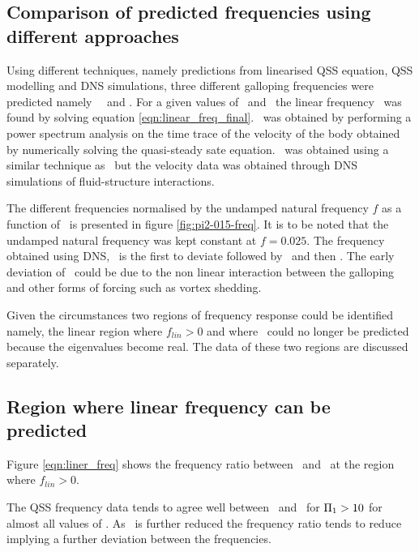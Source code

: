 \subsection{Comparison of predicted frequencies using different approaches}

Using different techniques, namely predictions from linearised QSS equation, QSS modelling and DNS simulations, three different galloping frequencies were predicted namely \freqlin\ \freqqss\ and \freqdns. For a given values of \massstiff\ and \massdamp\, the linear frequency \freqlin\ was found by solving equation \ref{eqn:linear_freq_final}. \freqqss\ was obtained by performing a power spectrum analysis on the time trace of the velocity of the body  obtained by numerically solving the quasi-steady sate equation. \freqdns\ was obtained using a similar technique as \freqqss\ but the velocity data was obtained through DNS simulations of fluid-structure interactions. 



The different frequencies normalised by the undamped natural frequency $f$ as a function of \massstiff\ is presented in figure \ref{fig:pi2-015-freq}. It is to be noted that the undamped natural frequency was kept constant at $f=0.025$. The frequency obtained using DNS, \freqdns\ is the first to deviate followed by \freqqss\ and then \freqlin. The early deviation of \freqdns\ could be due to the non linear interaction between the galloping and other forms of forcing such as vortex shedding.

Given the circumstances two regions of frequency response could be identified namely, the linear region where  $f_{lin}>0$ and where \freqlin\ could no longer be predicted because the eigenvalues become real. The data of these two regions are discussed separately.

\subsection{Region where linear frequency can be predicted}

Figure \ref{eqn:liner_freq} shows the frequency ratio between \freqlin\ and \freqqss\ at the region where $f_{lin}>0$. 


The QSS frequency data tends to agree well between \freqlin\ and \freqqss\ for $\Pi_1>10$ for almost all values of \massdamp. As \massstiff\ is further reduced the frequency ratio tends to reduce implying a further deviation between the frequencies.   

